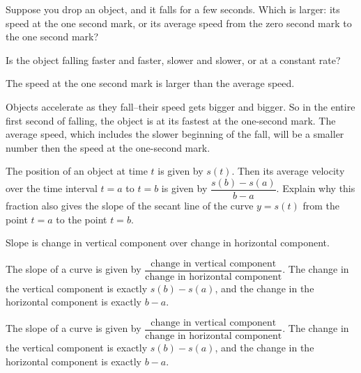 \begin{question}
Suppose you drop an object, and it falls for a few seconds. Which is larger: its speed at the one second mark, or its average speed from the zero second mark to the one second mark?
\end{question}
\begin{hint}
Is the object falling faster and faster, slower and slower, or at a constant rate?
\end{hint}
\begin{answer}
The speed at the one second mark is larger than the average speed.
\end{answer}
\begin{solution}
Objects accelerate as they fall--their speed gets bigger and bigger. So in the entire first second of falling, the object is at its fastest at the one-second mark. The average speed, which includes the slower beginning of the fall, will be a smaller number then the speed at the one-second mark.
\end{solution}

\begin{Mquestion}
The position of an object at time $t$ is given by $s(t)$. Then its average velocity over the time interval $t=a$ to $t=b$ is given by $\dfrac{s(b)-s(a)}{b-a}$. Explain why this fraction also gives the slope of the secant line of the curve $y=s(t)$ from the point $t=a$ to the point $t=b$.
\end{Mquestion}
\begin{hint}
Slope is change in vertical component over change in horizontal component.
\end{hint}
\begin{answer}
The slope of a curve is given by $\dfrac{\mbox{change in vertical component}}{\mbox{change in horizontal component}}$. The change in the vertical component is exactly $s(b)-s(a)$, and the change in the horizontal component is exactly $b-a$.
\end{answer}
\begin{solution}
The slope of a curve is given by $\dfrac{\mbox{change in vertical component}}{\mbox{change in horizontal component}}$. The change in the vertical component is exactly $s(b)-s(a)$, and the change in the horizontal component is exactly $b-a$.
\end{solution}

